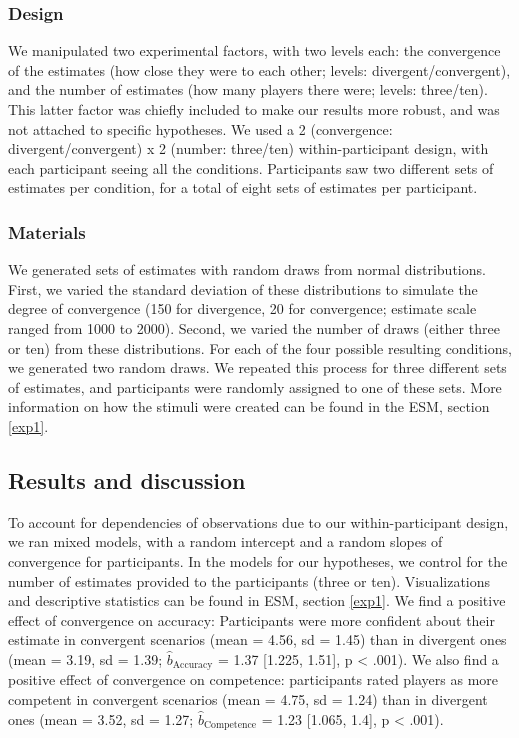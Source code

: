 \documentclass[
  doc,floatsintext]{apa6}
\begin{document}
\subsubsection{Design}\label{design}

We manipulated two experimental factors, with two levels each: the convergence of the estimates (how close they were to each other; levels: divergent/convergent), and the number of estimates (how many players there were; levels: three/ten). This latter factor was chiefly included to make our results more robust, and was not attached to specific hypotheses. We used a 2 (convergence: divergent/convergent) x 2 (number: three/ten) within-participant design, with each participant seeing all the conditions. Participants saw two different sets of estimates per condition, for a total of eight sets of estimates per participant.

\subsubsection{Materials}\label{materials}

We generated sets of estimates with random draws from normal distributions. First, we varied the standard deviation of these distributions to simulate the degree of convergence (150 for divergence, 20 for convergence; estimate scale ranged from 1000 to 2000). Second, we varied the number of draws (either three or ten) from these distributions. For each of the four possible resulting conditions, we generated two random draws. We repeated this process for three different sets of estimates, and participants were randomly assigned to one of these sets. More information on how the stimuli were created can be found in the ESM, section \ref{exp1}.

\subsection{Results and discussion}\label{results-and-discussion}

To account for dependencies of observations due to our within-participant design, we ran mixed models, with a random intercept and a random slopes of convergence for participants. In the models for our hypotheses, we control for the number of estimates provided to the participants (three or ten). Visualizations and descriptive statistics can be found in ESM, section \ref{exp1}. We find a positive effect of convergence on accuracy: Participants were more confident about their estimate in convergent scenarios (mean = 4.56, sd = 1.45) than in divergent ones (mean = 3.19, sd = 1.39; \(\hat{b}_{\text{Accuracy}}\) = 1.37 {[}1.225, 1.51{]}, p \textless{} .001). We also find a positive effect of convergence on competence: participants rated players as more competent in convergent scenarios (mean = 4.75, sd = 1.24) than in divergent ones (mean = 3.52, sd = 1.27; \(\hat{b}_{\text{Competence}}\) = 1.23 {[}1.065, 1.4{]}, p \textless{} .001).
\end{document}
